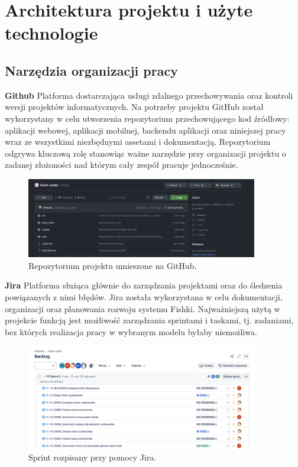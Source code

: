 \chapter{Architektura projektu i użyte technologie}

\section{Narzędzia organizacji pracy}

\textbf{Github} Platforma dostarczająca usługi zdalnego przechowywania oraz kontroli wersji projektów informatycznych. Na potrzeby projektu GitHub został wykorzystany w celu utworzenia repozytorium przechowującego kod źródłowy: aplikacji webowej, aplikacji mobilnej, backendu aplikacji oraz niniejszej pracy wraz ze wszystkimi niezbędnymi assetami i dokumentacją. Repozytorium odgrywa kluczową rolę stanowiąc ważne narzędzie przy organizacji projektu o zadanej złożoności nad którym cały zespół pracuje jednocześnie.

\begin{figure}[H]
    \centering
    \includegraphics[width=0.9\textwidth]{chapters/chapter_7/github}
    \caption{Repozytorium projektu umieszone na GitHub.}
    \label{img:github}
\end{figure}


\textbf{Jira} Platforma służąca głównie do zarządzania projektami oraz do śledzenia powiązanych z nimi błędów. Jira została wykorzystana w celu dokumentacji, organizacji oraz planowania rozwoju systemu Fishki. Najważniejszą użytą w projekcie funkcją jest możliwość zarządzania sprintami i taskami, tj. zadaniami, bez których realizacja pracy w wybranym modelu byłaby niemożliwa.

\begin{figure}[H]
    \centering
    \includegraphics[width=0.9\textwidth]{chapters/chapter_7/jira}
    \caption{Sprint rozpisany przy pomocy Jira.}
    \label{img:jira}
\end{figure}


